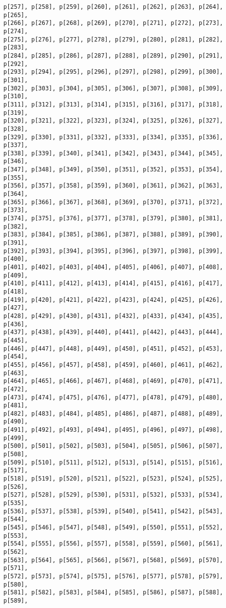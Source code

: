 \documentclass[
  letterpaper,
  DIV=11,
  numbers=noendperiod]{scrartcl}
\begin{document}
\begin{verbatim}
p[257], p[258], p[259], p[260], p[261], p[262], p[263], p[264], p[265],
p[266], p[267], p[268], p[269], p[270], p[271], p[272], p[273], p[274],
p[275], p[276], p[277], p[278], p[279], p[280], p[281], p[282], p[283],
p[284], p[285], p[286], p[287], p[288], p[289], p[290], p[291], p[292],
p[293], p[294], p[295], p[296], p[297], p[298], p[299], p[300], p[301],
p[302], p[303], p[304], p[305], p[306], p[307], p[308], p[309], p[310],
p[311], p[312], p[313], p[314], p[315], p[316], p[317], p[318], p[319],
p[320], p[321], p[322], p[323], p[324], p[325], p[326], p[327], p[328],
p[329], p[330], p[331], p[332], p[333], p[334], p[335], p[336], p[337],
p[338], p[339], p[340], p[341], p[342], p[343], p[344], p[345], p[346],
p[347], p[348], p[349], p[350], p[351], p[352], p[353], p[354], p[355],
p[356], p[357], p[358], p[359], p[360], p[361], p[362], p[363], p[364],
p[365], p[366], p[367], p[368], p[369], p[370], p[371], p[372], p[373],
p[374], p[375], p[376], p[377], p[378], p[379], p[380], p[381], p[382],
p[383], p[384], p[385], p[386], p[387], p[388], p[389], p[390], p[391],
p[392], p[393], p[394], p[395], p[396], p[397], p[398], p[399], p[400],
p[401], p[402], p[403], p[404], p[405], p[406], p[407], p[408], p[409],
p[410], p[411], p[412], p[413], p[414], p[415], p[416], p[417], p[418],
p[419], p[420], p[421], p[422], p[423], p[424], p[425], p[426], p[427],
p[428], p[429], p[430], p[431], p[432], p[433], p[434], p[435], p[436],
p[437], p[438], p[439], p[440], p[441], p[442], p[443], p[444], p[445],
p[446], p[447], p[448], p[449], p[450], p[451], p[452], p[453], p[454],
p[455], p[456], p[457], p[458], p[459], p[460], p[461], p[462], p[463],
p[464], p[465], p[466], p[467], p[468], p[469], p[470], p[471], p[472],
p[473], p[474], p[475], p[476], p[477], p[478], p[479], p[480], p[481],
p[482], p[483], p[484], p[485], p[486], p[487], p[488], p[489], p[490],
p[491], p[492], p[493], p[494], p[495], p[496], p[497], p[498], p[499],
p[500], p[501], p[502], p[503], p[504], p[505], p[506], p[507], p[508],
p[509], p[510], p[511], p[512], p[513], p[514], p[515], p[516], p[517],
p[518], p[519], p[520], p[521], p[522], p[523], p[524], p[525], p[526],
p[527], p[528], p[529], p[530], p[531], p[532], p[533], p[534], p[535],
p[536], p[537], p[538], p[539], p[540], p[541], p[542], p[543], p[544],
p[545], p[546], p[547], p[548], p[549], p[550], p[551], p[552], p[553],
p[554], p[555], p[556], p[557], p[558], p[559], p[560], p[561], p[562],
p[563], p[564], p[565], p[566], p[567], p[568], p[569], p[570], p[571],
p[572], p[573], p[574], p[575], p[576], p[577], p[578], p[579], p[580],
p[581], p[582], p[583], p[584], p[585], p[586], p[587], p[588], p[589],

\end{verbatim}
\end{document}
